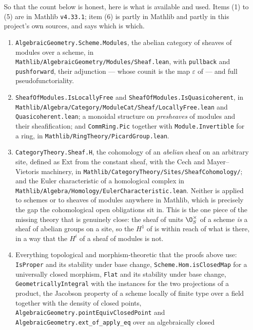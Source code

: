 So that the count below is honest, here is what is available and used.  Items
(1) to (5) are in Mathlib \texttt{v4.33.1}; item (6) is partly in Mathlib and
partly in this project's own sources, and says which is which.
\begin{enumerate}
  \item \texttt{AlgebraicGeometry.Scheme.Modules}, the abelian category of
  sheaves of modules over a scheme, in
  \texttt{Mathlib/AlgebraicGeometry/Modules/Sheaf.lean}, with
  \texttt{pullback} and \texttt{pushforward}, their adjunction --- whose
  counit is the map $\varepsilon$ of  --- and full
  pseudofunctoriality.
  \item \texttt{SheafOfModules.IsLocallyFree} and
  \texttt{SheafOfModules.IsQuasicoherent}, in
  \texttt{Mathlib/Algebra/Category/ModuleCat/Sheaf/LocallyFree.lean} and
  \texttt{Quasicoherent.lean}; a monoidal structure on \emph{presheaves} of
  modules and their sheafification; and \texttt{CommRing.Pic} together with
  \texttt{Module.Invertible} for a ring, in
  \texttt{Mathlib/RingTheory/PicardGroup.lean}.
  \item \texttt{CategoryTheory.Sheaf.H}, the cohomology of an \emph{abelian}
  sheaf on an arbitrary site, defined as $\mathrm{Ext}$ from the constant
  sheaf, with the Cech and Mayer--Vietoris machinery, in
  \texttt{Mathlib/CategoryTheory/Sites/SheafCohomology/}; and the Euler
  characteristic of a homological complex in
  \texttt{Mathlib/Algebra/Homology/EulerCharacteristic.lean}.  Neither is
  applied to schemes or to sheaves of modules anywhere in Mathlib, which is
  precisely the gap the cohomological open obligations sit in.  This is the
  one piece of the missing theory that is genuinely close: the sheaf of units
  $\O_S^\times$ of a scheme \emph{is} a sheaf of abelian groups on a site, so
  the $H^1$ of  is within reach of what is
  there, in a way that the $H^i$ of a sheaf of modules is not.
  \item Everything topological and morphism-theoretic that the proofs above
  use: \texttt{IsProper} and its stability under base change,
  \texttt{Scheme.Hom.isClosedMap} for a universally closed morphism,
  \texttt{Flat} and its stability under base change,
  \texttt{GeometricallyIntegral} with the instances for the two projections of
  a product, the Jacobson property of a scheme locally of finite type over a
  field together with the density of closed points,
  \texttt{AlgebraicGeometry.pointEquivClosedPoint} and
  \texttt{AlgebraicGeometry.ext\_of\_apply\_eq} over an algebraically closed

\end{enumerate}
